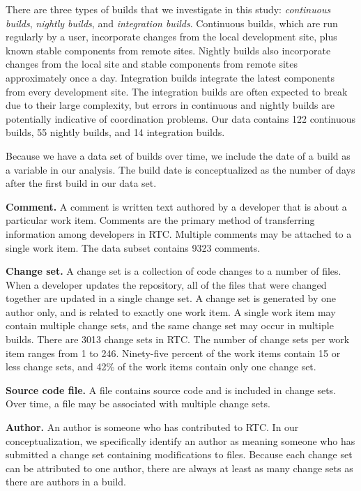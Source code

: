 \documentclass[12pt,oneside]{book}
\begin{document}
There are three types of builds that we investigate in this study: \emph{continuous builds}, \emph{nightly builds}, and \emph{integration builds}. Continuous builds, which are run regularly by a user, incorporate changes from the local development site, plus known stable components from remote sites.  Nightly builds also incorporate changes from the local site and stable components from remote sites approximately once a day. Integration builds integrate the latest components from every development site. The integration builds are often expected to break due to their large complexity, but errors in continuous and nightly builds are potentially indicative of coordination problems. Our data contains 122 continuous builds, 55 nightly builds, and 14 integration builds.

Because we have a data set of builds over time, we include the date of a build as a variable in our analysis. The build date is conceptualized as the number of days after the first build in our data set.

\textbf{Comment.} A comment is written text authored by a developer that is about a particular work item. Comments are the primary method of transferring information among developers in RTC. Multiple comments may be attached to a single work item. The data subset contains 9323 comments.

\textbf{Change set.} A change set is a collection of code changes to a number of files. When a developer updates the repository, all of the files that were changed together are updated in a single change set. A change set is generated by one author only, and is related to exactly one work item. A single work item may contain multiple change sets, and the same change set may occur in multiple builds. There are 3013 change sets in RTC. The number of change sets per work item ranges from 1 to 246. Ninety-five percent of the work items contain 15 or less change sets, and 42\% of the work items contain only one change set.

\textbf{Source code file.} A file contains source code and is included in change sets. Over time, a file may be associated with multiple change sets.

\textbf{Author.} An author is someone who has contributed to RTC. In our conceptualization, we specifically identify an author as meaning someone who has submitted a change set containing modifications to files. Because each change set can be attributed to one author, there are always at least as many change sets as there are authors in a build.
\end{document}
